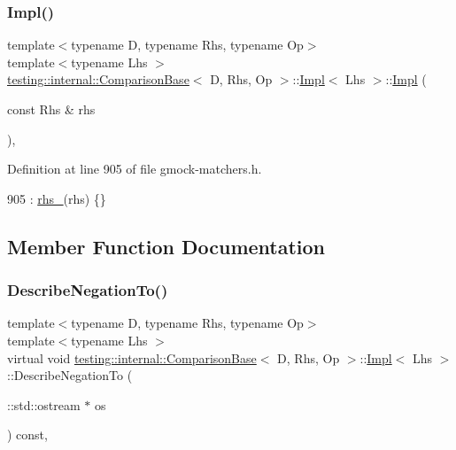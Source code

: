 \subsubsection{\texorpdfstring{Impl()}{Impl()}}
{\footnotesize\ttfamily template$<$typename D, typename Rhs, typename Op$>$ \\
template$<$typename Lhs $>$ \\
\hyperlink{classtesting_1_1internal_1_1ComparisonBase}{testing\+::internal\+::\+Comparison\+Base}$<$ D, Rhs, Op $>$\+::\hyperlink{classtesting_1_1internal_1_1ComparisonBase_1_1Impl}{Impl}$<$ Lhs $>$\+::\hyperlink{classtesting_1_1internal_1_1ComparisonBase_1_1Impl}{Impl} (\begin{DoxyParamCaption}\item[{const Rhs \&}]{rhs }\end{DoxyParamCaption})\hspace{0.3cm}{\ttfamily [inline]}, {\ttfamily [explicit]}}



Definition at line 905 of file gmock-\/matchers.\+h.


\begin{DoxyCode}
905 : \hyperlink{classtesting_1_1internal_1_1ComparisonBase_1_1Impl_aa665caf1136e3a09f8019296ccbdea44}{rhs\_}(rhs) \{\}
\end{DoxyCode}


\subsection{Member Function Documentation}
\mbox{\label{classtesting_1_1internal_1_1ComparisonBase_1_1Impl_ab4a33d42d0941bc94e3b0051ce76bb72}} 
\subsubsection{\texorpdfstring{Describe\+Negation\+To()}{DescribeNegationTo()}}
{\footnotesize\ttfamily template$<$typename D, typename Rhs, typename Op$>$ \\
template$<$typename Lhs $>$ \\
virtual void \hyperlink{classtesting_1_1internal_1_1ComparisonBase}{testing\+::internal\+::\+Comparison\+Base}$<$ D, Rhs, Op $>$\+::\hyperlink{classtesting_1_1internal_1_1ComparisonBase_1_1Impl}{Impl}$<$ Lhs $>$\+::Describe\+Negation\+To (\begin{DoxyParamCaption}\item[{\+::std\+::ostream $\ast$}]{os }\end{DoxyParamCaption}) const\hspace{0.3cm}{\ttfamily [inline]}, {\ttfamily [virtual]}}



